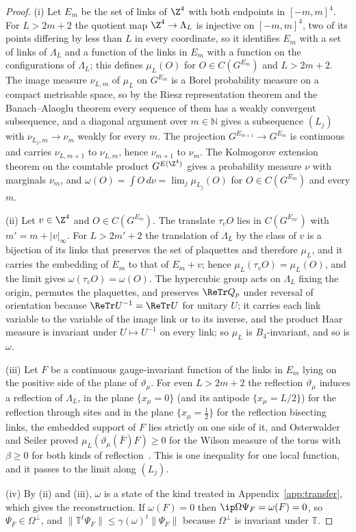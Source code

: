 \begin{proof}
(i) Let $E_m$ be the set of links of $\Z^4$ with both endpoints in
$[-m,m]^4$. For $L>2m+2$ the quotient map $\Z^4\to\Lambda_L$ is injective on
$[-m,m]^4$, two of its points differing by less than $L$ in every
coordinate, so it identifies $E_m$ with a set of links of $\Lambda_L$ and a
function of the links in $E_m$ with a function on the configurations of
$\Lambda_L$; this defines $\mu_L(O)$ for $O\in C(G^{E_m})$ and $L>2m+2$. The
image measure $\nu_{L,m}$ of $\mu_L$ on $G^{E_m}$ is a Borel probability
measure on a compact metrisable space, so by the Riesz representation
theorem and the Banach--Alaoglu theorem every sequence of them has a weakly
convergent subsequence, and a diagonal argument over $m\in\mathbb N$ gives a
subsequence $(L_j)$ with $\nu_{L_j,m}\to\nu_m$ weakly for every $m$. The
projection $G^{E_{m+1}}\to G^{E_m}$ is continuous and carries $\nu_{L,m+1}$
to $\nu_{L,m}$, hence $\nu_{m+1}$ to $\nu_m$. The Kolmogorov extension
theorem on the countable product $G^{E(\Z^4)}$ gives a probability measure
$\nu$ with marginals $\nu_m$, and $\omega(O)=\int O\,d\nu=\lim_j\mu_{L_j}(O)$
for $O\in C(G^{E_m})$ and every $m$.

(ii) Let $v\in\Z^4$ and $O\in C(G^{E_m})$. The translate $\tau_vO$ lies in
$C(G^{E_{m'}})$ with $m'=m+|v|_\infty$. For $L>2m'+2$ the translation of
$\Lambda_L$ by the class of $v$ is a bijection of its links that preserves
the set of plaquettes and therefore $\mu_L$, and it carries the embedding of
$E_m$ to that of $E_m+v$; hence $\mu_L(\tau_vO)=\mu_L(O)$, and the limit
gives $\omega(\tau_vO)=\omega(O)$. The hypercubic group acts on $\Lambda_L$
fixing the origin, permutes the plaquettes, and preserves $\ReTr Q_p$ under
reversal of orientation because $\ReTr U^{-1}=\ReTr U$ for unitary $U$; it
carries each link variable to the variable of the image link or to its
inverse, and the product Haar measure is invariant under $U\mapsto U^{-1}$
on every link; so $\mu_L$ is $B_4$-invariant, and so is $\omega$.

(iii) Let $F$ be a continuous gauge-invariant function of the links in
$E_m$ lying on the positive side of the plane of $\vartheta_\mu$. For even
$L>2m+2$ the reflection $\vartheta_\mu$ induces a reflection of $\Lambda_L$,
in the plane $\{x_\mu=0\}$ (and its antipode $\{x_\mu=L/2\}$) for the
reflection through sites and in the plane $\{x_\mu=\frac12\}$ for the
reflection bisecting links, the embedded support of $F$ lies strictly on one
side of it, and Osterwalder and Seiler proved $\mu_L(\vartheta_\mu(\bar F)
F)\ge0$ for the Wilson measure of the torus with $\beta\ge0$ for both kinds
of reflection~\cite{OSei78,Sei82}. This is one inequality for one local
function, and it passes to the limit along $(L_j)$.

(iv) By (ii) and (iii), $\omega$ is a state of the kind treated in
Appendix~\ref{app:transfer}, which gives the reconstruction. If
$\omega(F)=0$ then $\ip\Omega{\Psi_F}=\omega(F)=0$, so $\Psi_F\in
\Omega^\perp$, and $\|\mathbb T^t\Psi_F\|\le\gamma(\omega)^t\|\Psi_F\|$
because $\Omega^\perp$ is invariant under $\mathbb T$.
\end{proof}

